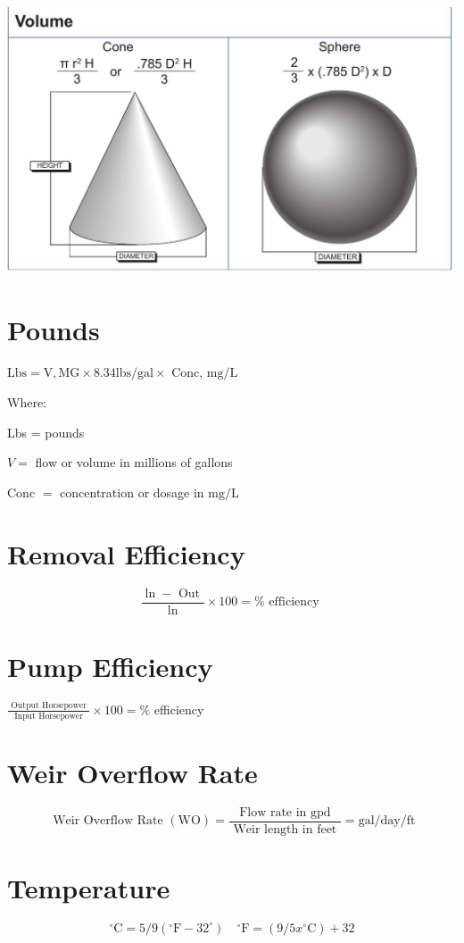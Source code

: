 \documentclass[10pt]{article}
\begin{document}
\includegraphics[max width=\textwidth]{2022_09_11_72dbedc910e6e984560cg-03}

\section{Pounds}
$\mathrm{Lbs}=\mathrm{V}, \mathrm{MG} \times 8.34 \mathrm{lbs} / \mathrm{gal} \times$ Conc, $\mathrm{mg} / \mathrm{L}$

Where:

Lbs = pounds

$V=$ flow or volume in millions of gallons

Conc $=$ concentration or dosage in $\mathrm{mg} / \mathrm{L}$

\section{Removal Efficiency}
$$
\frac{\ln -\text { Out }}{\ln } \times 100=\% \text { efficiency }
$$

\section{Pump Efficiency}
$\frac{\text { Output Horsepower }}{\text { Input Horsepower }} \times 100=\%$ efficiency

\section{Weir Overflow Rate}
$$
\text { Weir Overflow Rate }(\mathrm{WO})=\frac{\text { Flow rate in gpd }}{\text { Weir length in feet }}=\mathrm{gal} / \mathrm{day} / \mathrm{ft}
$$

\section{Temperature}
$$
{ }^{\circ} \mathrm{C}=5 / 9\left({ }^{\circ} \mathrm{F}-32^{\circ}\right) \quad{ }^{\circ} \mathrm{F}=\left(9 / 5 x{ }^{\circ} \mathrm{C}\right)+32
$$
\end{document}
